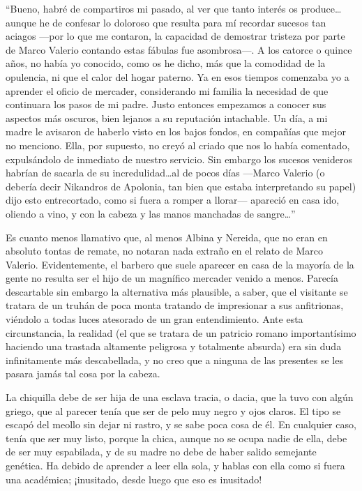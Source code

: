 \documentclass[11pt,openany]{book}
\begin{document}
``Bueno, habré de compartiros mi pasado, al ver que tanto interés os produce\dots aunque he de confesar  lo doloroso que resulta para mí recordar sucesos tan aciagos ---por lo que me contaron, la capacidad de demostrar tristeza por parte de Marco Valerio contando estas fábulas fue asombrosa---. A los catorce o quince años, no había yo conocido, como os he dicho, más que la comodidad de la opulencia, ni que el calor del hogar paterno. Ya en esos tiempos comenzaba yo a aprender el oficio de mercader, considerando mi familia la necesidad de que continuara los pasos de mi padre. Justo entonces empezamos a conocer sus aspectos más oscuros, bien lejanos a su reputación intachable. Un día, a mi madre le avisaron de haberlo visto en los bajos fondos, en compañías que mejor no menciono. Ella, por supuesto, no creyó al criado que nos lo había comentado, expulsándolo de inmediato de nuestro servicio. Sin embargo los sucesos venideros habrían de sacarla de su incredulidad\dots al de pocos días ---Marco Valerio (o debería decir Nikandros de Apolonia, tan bien que estaba interpretando su papel) dijo esto entrecortado, como si fuera a romper a llorar--- apareció en casa ido, oliendo a vino, y con la cabeza y las manos manchadas de sangre\dots''

Es cuanto menos llamativo que, al menos Albina y Nereida, que no eran en absoluto tontas de remate, no notaran nada extraño en el relato de Marco Valerio. Evidentemente, el barbero que suele aparecer en casa de la mayoría de la gente no resulta ser el hijo de un magnífico mercader venido a menos. Parecía descartable sin embargo la alternativa más plausible, a saber, que el visitante se tratara de un truhán de poca monta tratando de impresionar a sus anfitrionas, viéndolo a todas luces atesorado de un gran entendimiento. Ante esta circunstancia, la realidad (el que se tratara de un patricio romano importantísimo haciendo una trastada altamente peligrosa y totalmente absurda) era sin duda infinitamente más descabellada, y no creo que a ninguna de las presentes se les pasara jamás tal cosa por la cabeza.  





La chiquilla debe de ser hija de una esclava tracia, o dacia, que la tuvo con algún griego, que al parecer tenía que ser de pelo muy negro y ojos claros. El tipo se escapó del meollo sin dejar ni rastro, y se sabe poca cosa de él. En cualquier caso, tenía que ser muy listo, porque la chica, aunque no se ocupa nadie de ella, debe de ser muy espabilada, y de su madre no debe de haber salido semejante genética. Ha debido de aprender a leer ella sola, y hablas con ella como si fuera una académica; ¡inusitado, desde luego que eso es inusitado! 
\end{document}
